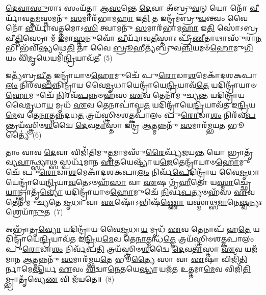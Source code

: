 {\anuvakamend[{\-\ul{𑌵𑍃}\-\-\ul{𑌣𑌾}\-\-\ul{𑌮}\-\-\ul{𑌹𑍈} 𑌯\-\ul{𑌤𑍍𑌪𑍁}\-𑌰\-\ul{𑌸𑍍𑌤𑌾}\-𑌦𑍍𑌰𑌕𑍍𑌷𑌾𑍞᳴𑌸𑌿 𑌵𑌪𑍇\-\ul{𑌦}\-𑌗𑍍𑌨𑌯𑍇᳴ 𑌵𑌿\-\ul{𑌬𑌾}\-𑌧𑌵᳴𑌤 \ul{𑌏}\-𑌵𑌂 \ul{𑌚}\-𑌤𑍍𑌵𑌾𑌰𑌿᳴ 𑌚}]}%

\-\ul{𑌦𑍇}\-\-\ul{𑌵𑌾}\-\-\ul{𑌸𑍁}\-𑌰𑌾𑌃 𑌸𑌂𑌯᳴𑌤𑍍𑌤𑌾 𑌆\-\ul{𑌸}\-𑌨𑍍𑌤𑍇 \ul{𑌦𑍇}\-𑌵𑌾 𑌅᳴𑌬𑍍𑌰𑍁\-\ul{𑌵}\-𑌨𑍍 𑌯𑍋 𑌨𑍋᳴ \ul{𑌵𑍀}\-𑌰𑍍𑌯𑌾᳴𑌵𑌤𑍍𑌤\-\ul{𑌮}\-𑌸𑍍𑌤𑌮𑌨𑍁᳴ \ul{𑌸}\-𑌮𑌾𑌰᳴𑌭𑌾𑌮\-\ul{𑌹𑌾} 𑌇\-\ul{𑌤𑌿} 𑌤 𑌇𑌨𑍍𑌦𑍍𑌰᳴𑌮𑌬𑍍𑌰𑍁\-\ul{𑌵}\-𑌨𑍍𑌤𑍍𑌵𑌂 𑌵𑍈 𑌨𑍋᳴ \ul{𑌵𑍀}\-𑌰𑍍𑌯𑌾᳴𑌵𑌤𑍍𑌤𑌮𑍋\-𑌽\-\ul{𑌸𑌿} 𑌤𑍍𑌵𑌾𑌮𑌨𑍁᳴ \ul{𑌸}\-𑌮𑌾𑌰᳴𑌭𑌾𑌮\-\ul{𑌹𑌾} 𑌇\-\ul{𑌤𑌿} 𑌸𑍋॑\-𑌽𑌬𑍍𑌰𑌵𑍀\-\ul{𑌤𑍍𑌤𑌿}\-𑌸𑍍𑌰𑍋 𑌮᳴ \ul{𑌇}\-𑌮𑌾\-\ul{𑌸𑍍𑌤}\-𑌨𑍁𑌵𑍋᳴ \ul{𑌵𑍀}\-𑌰𑍍𑌯𑌾᳴𑌵\-\ul{𑌤𑍀}\-𑌸𑍍𑌤𑌾𑌃 𑌪𑍍𑌰𑍀᳴\-\ul{𑌣𑍀}\-𑌤𑌾𑌥𑌾𑌸𑍁᳴𑌰𑌾\-\ul{𑌨}\-𑌭𑌿 𑌭᳴𑌵𑌿\-\ul{𑌷𑍍𑌯}\-𑌥𑍇\-\ul{𑌤𑌿} 𑌤𑌾 𑌵𑍈 \ul{𑌬𑍍𑌰𑍂}\-𑌹𑍀𑌤𑍍𑌯᳴𑌬𑍍𑌰𑍁𑌵\-\ul{𑌨𑍍𑌨𑌿}\-𑌯𑌮𑍞᳴\-\ul{𑌹𑍋}\-𑌮𑍁\-\ul{𑌗𑌿}\-𑌯𑌂 𑌵𑌿᳴\-\ul{𑌮𑍃}\-𑌧𑍇𑌯𑌮𑌿᳴\-\ul{𑌨𑍍𑌦𑍍𑌰𑌿}\-𑌯𑌾𑌵᳴𑌤𑍀~(5)

𑌇𑌤𑍍𑌯᳴𑌬𑍍𑌰\-\ul{𑌵𑍀}\-𑌤𑍍𑌤 𑌇𑌨𑍍𑌦𑍍𑌰𑌾᳴𑌯𑌾𑍞\-\ul{𑌹𑍋}\-𑌮𑍁𑌚𑍇᳴ 𑌪𑍁\-\ul{𑌰𑍋}\-𑌡𑌾\-\ul{𑌶}\-𑌮𑍇𑌕𑌾᳴\-𑌦𑌶\-𑌕𑌪𑌾\-\ul{𑌲𑌂} 𑌨𑌿𑌰᳴𑌵\-\ul{𑌪}\-𑌨𑍍𑌨𑌿𑌨𑍍𑌦𑍍𑌰𑌾᳴𑌯 𑌵𑍈\-\ul{𑌮𑍃}\-𑌧𑌾𑌯𑍇𑌨𑍍𑌦𑍍𑌰𑌾᳴𑌯𑍇\-\ul{𑌨𑍍𑌦𑍍𑌰𑌿}\-𑌯𑌾𑌵᳴\-\ul{𑌤𑍇} 𑌯𑌦𑌿𑌨𑍍𑌦𑍍𑌰𑌾᳴𑌯𑌾𑍞\-\ul{𑌹𑍋}\-𑌮𑍁𑌚𑍇᳴ \ul{𑌨𑌿}\-𑌰𑌵᳴\-\ul{𑌪}\-𑌨𑍍𑌨𑍞𑌹᳴𑌸 \ul{𑌏}\-𑌵 𑌤𑍇𑌨𑌾᳴𑌮𑍁𑌚𑍍𑌯\-\ul{𑌨𑍍𑌤} 𑌯𑌦𑌿𑌨𑍍𑌦𑍍𑌰𑌾᳴𑌯 𑌵𑍈\-\ul{𑌮𑍃}\-𑌧𑌾\-\ul{𑌯} 𑌮𑍃𑌧᳴ \ul{𑌏}\-𑌵 𑌤𑍇𑌨𑌾𑌪𑌾॑𑌘𑍍𑌨\-\ul{𑌤} 𑌯𑌦𑌿𑌨𑍍𑌦𑍍𑌰𑌾᳴𑌯𑍇\-\ul{𑌨𑍍𑌦𑍍𑌰𑌿}\-𑌯𑌾𑌵᳴𑌤 𑌇\-\ul{𑌨𑍍𑌦𑍍𑌰𑌿}\-𑌯\-\ul{𑌮𑍇}\-𑌵 𑌤𑍇\-\ul{𑌨𑌾}\-𑌤𑍍𑌮𑌨𑍍𑌨᳴𑌦𑌧\-\ul{𑌤} 𑌤𑍍𑌰𑌯᳴𑌸𑍍𑌤𑍍𑌰𑌿𑍞𑌶𑌤𑍍𑌕𑌪𑌾𑌲𑌂 𑌪𑍁\-\ul{𑌰𑍋}\-𑌡𑌾\-\ul{𑌶𑌂} 𑌨𑌿𑌰᳴𑌵\-\ul{𑌪}\-𑌨𑍍𑌤𑍍𑌰𑌯᳴𑌸𑍍𑌤𑍍𑌰𑌿𑍞\-\ul{𑌶}\-𑌦𑍍𑌵𑍈 \ul{𑌦𑍇}\-𑌵\-\ul{𑌤𑌾}\-𑌸𑍍𑌤𑌾 𑌇𑌨𑍍𑌦𑍍𑌰᳴ \ul{𑌆}\-𑌤𑍍𑌮𑌨𑍍𑌨𑌨𑍁᳴ \ul{𑌸}\-𑌮𑌾𑌰᳴𑌮𑍍𑌭𑌯\-\ul{𑌤} 𑌭𑍂𑌤𑍍𑌯𑍈॑~(6)

𑌤𑌾𑌂 𑌵𑌾𑌵 \ul{𑌦𑍇}\-𑌵𑌾 𑌵𑌿𑌜𑌿᳴𑌤𑌿𑌮𑍁\-\ul{𑌤𑍍𑌤}\-𑌮𑌾𑌮𑌸𑍁᳴\-\ul{𑌰𑍈}\-𑌰𑍍𑌵𑍍𑌯᳴𑌜𑌯\-\ul{𑌨𑍍𑌤} 𑌯𑍋 𑌭𑍍𑌰𑌾𑌤𑍃᳴𑌵𑍍𑌯\-\ul{𑌵𑌾}\-𑌨𑍍𑌥𑍍𑌸𑍍𑌯𑌾𑌥𑍍𑌸 𑌸𑍍𑌪𑌰𑍍𑌧᳴𑌮𑌾𑌨 \ul{𑌏}\-𑌤𑌯𑍇𑌷𑍍𑌟𑍍𑌯𑌾᳴ 𑌯\-\ul{𑌜𑍇}\-𑌤𑍇𑌨𑍍𑌦𑍍𑌰𑌾᳴𑌯𑌾𑍞\-\ul{𑌹𑍋}\-𑌮𑍁𑌚𑍇᳴ 𑌪𑍁\-\ul{𑌰𑍋}\-𑌡𑌾\-\ul{𑌶}\-𑌮𑍇𑌕𑌾᳴\-𑌦𑌶\-𑌕𑌪𑌾\-\ul{𑌲𑌂} 𑌨𑌿𑌰𑍍𑌵᳴\-\ul{𑌪𑍇}\-𑌦𑌿𑌨𑍍𑌦𑍍𑌰𑌾᳴𑌯 𑌵𑍈\-\ul{𑌮𑍃}\-𑌧𑌾𑌯𑍇𑌨𑍍𑌦𑍍𑌰𑌾᳴𑌯𑍇\-\ul{𑌨𑍍𑌦𑍍𑌰𑌿}\-𑌯𑌾\-\ul{𑌵}\-𑌤𑍇\-𑌽𑍞𑌹᳴\-\ul{𑌸𑌾} 𑌵𑌾 \ul{𑌏}\-𑌷 𑌗𑍃᳴\-\ul{𑌹𑍀}\-𑌤𑍋 𑌯\-\ul{𑌸𑍍𑌮𑌾}\-𑌚𑍍𑌛𑍍𑌰𑍇\-\ul{𑌯𑌾}\-𑌨𑍍𑌭𑍍𑌰𑌾𑌤𑍃᳴\-\ul{𑌵𑍍𑌯𑍋} 𑌯𑌦𑌿𑌨𑍍𑌦𑍍𑌰𑌾᳴𑌯𑌾𑍞\-\ul{𑌹𑍋}\-𑌮𑍁𑌚𑍇᳴ \ul{𑌨𑌿}\-𑌰𑍍𑌵\-\ul{𑌪}\-𑌤𑍍𑌯𑍞𑌹᳴𑌸 \ul{𑌏}\-𑌵 𑌤𑍇𑌨᳴ 𑌮𑍁𑌚𑍍𑌯𑌤𑍇 \ul{𑌮𑍃}\-𑌧𑌾 𑌵𑌾 \ul{𑌏}\-𑌷𑍋᳴\-𑌽𑌭𑌿𑌷᳴\-\ul{𑌣𑍍𑌣𑍋} 𑌯𑌸𑍍𑌮𑌾॑𑌥𑍍𑌸\-\ul{𑌮𑌾}\-𑌨𑍇\-\ul{𑌷𑍍𑌵}\-𑌨𑍍𑌯𑌃 𑌶𑍍𑌰𑍇𑌯𑌾᳴\-\ul{𑌨𑍁}\-𑌤~(7)

𑌅𑌭𑍍𑌰𑌾᳴𑌤𑍃\-\ul{𑌵𑍍𑌯𑍋} 𑌯𑌦𑌿𑌨𑍍𑌦𑍍𑌰𑌾᳴𑌯 𑌵𑍈\-\ul{𑌮𑍃}\-𑌧𑌾\-\ul{𑌯} 𑌮𑍃𑌧᳴ \ul{𑌏}\-𑌵 𑌤𑍇𑌨𑌾𑌪᳴ 𑌹\-\ul{𑌤𑍇} 𑌯𑌦𑌿𑌨𑍍𑌦𑍍𑌰𑌾᳴𑌯𑍇\-\ul{𑌨𑍍𑌦𑍍𑌰𑌿}\-𑌯𑌾𑌵᳴𑌤 𑌇\-\ul{𑌨𑍍𑌦𑍍𑌰𑌿}\-𑌯\-\ul{𑌮𑍇}\-𑌵 𑌤𑍇\-\ul{𑌨𑌾}\-𑌤𑍍𑌮𑌨𑍍𑌧᳴\-\ul{𑌤𑍍𑌤𑍇} 𑌤𑍍𑌰𑌯᳴𑌸𑍍𑌤𑍍𑌰𑌿𑍞𑌶𑌤𑍍𑌕𑌪𑌾𑌲𑌂 𑌪𑍁\-\ul{𑌰𑍋}\-𑌡𑌾\-\ul{𑌶𑌂} 𑌨𑌿𑌰𑍍𑌵᳴𑌪\-\ul{𑌤𑌿} 𑌤𑍍𑌰𑌯᳴𑌸𑍍𑌤𑍍𑌰𑌿𑍞\-\ul{𑌶}\-𑌦𑍍𑌵𑍈 \ul{𑌦𑍇}\-𑌵\-\ul{𑌤𑌾}\-𑌸𑍍𑌤𑌾 \ul{𑌏}\-𑌵 𑌯𑌜᳴𑌮𑌾𑌨 \ul{𑌆}\-𑌤𑍍𑌮𑌨𑍍𑌨𑌨𑍁᳴ \ul{𑌸}\-𑌮𑌾𑌰᳴𑌮𑍍𑌭𑌯\-\ul{𑌤𑍇} 𑌭𑍂\-\ul{𑌤𑍍𑌯𑍈} 𑌸𑌾 𑌵𑌾 \ul{𑌏}\-𑌷𑌾 𑌵𑌿𑌜𑌿᳴\-\ul{𑌤𑌿}\-𑌰𑍍𑌨𑌾𑌮𑍇\-\ul{𑌷𑍍𑌟𑌿}\-𑌰𑍍𑌯 \ul{𑌏}\-𑌵𑌂 \ul{𑌵𑌿}\-𑌦𑍍𑌵𑌾\-\ul{𑌨𑍇}\-𑌤𑌯𑍇\-\ul{𑌷𑍍𑌟𑍍𑌯𑌾} 𑌯𑌜᳴𑌤 𑌉\-\ul{𑌤𑍍𑌤}\-𑌮𑌾\-\ul{𑌮𑍇}\-𑌵 𑌵𑌿𑌜𑌿᳴\-\ul{𑌤𑌿}\-𑌮𑍍𑌭𑍍𑌰𑌾𑌤𑍃᳴𑌵𑍍𑌯𑍇\-\ul{𑌣} 𑌵𑌿 𑌜᳴𑌯𑌤𑍇॥~(8)

